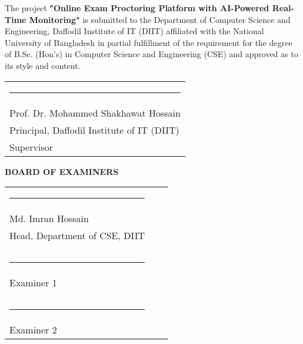 The project \textbf{"Online Exam Proctoring Platform with AI-Powered Real-Time Monitoring"} is submitted to the Department of Computer Science and Engineering, Daffodil Institute of IT (DIIT) affiliated with the National University of Bangladesh in partial fulfillment of the requirement for the degree of B.Sc. (Hon's) in Computer Science and Engineering (CSE) and approved as to its style and content.


\bigskip
\bigskip
\bigskip

\noindent \begin{tabular}{l}

  \rule{5cm}{1pt} \\
  Prof. Dr. Mohammed Shakhawat Hossain\\ %
  Principal, Daffodil Institute of IT (DIIT)\\
  Supervisor\\

\end{tabular}




\begin{center}
   \textbf{BOARD OF EXAMINERS}
   \vspace{2em}
\end{center}
\noindent \begin{tabular}{lp{1cm}r}
\centering
  \rule{4cm}{1pt}&\\
     Md. Imran Hossain  &&  \\
     Head, Department of CSE, DIIT
     \\
     \\
     \\
     \rule{4cm}{1pt}&\\
    Examiner 1
    \\ 
    \\
    \\
     \rule{4cm}{1pt}&\\
    Examiner 2 && 
    \\
     
   

\end{tabular}



